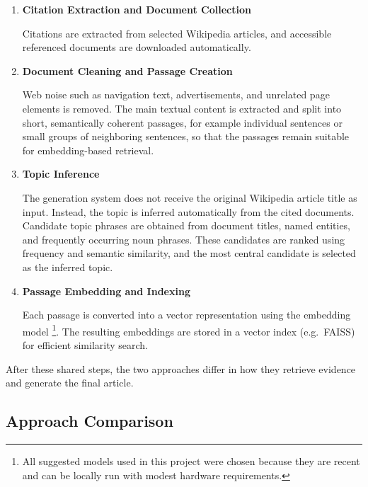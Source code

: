\documentclass[10pt,a4paper]{article}
\begin{document}
\begin{enumerate}
    \item \textbf{Citation Extraction and Document Collection}

    Citations are extracted from selected Wikipedia articles, and accessible referenced documents are downloaded automatically.

    \item \textbf{Document Cleaning and Passage Creation}

    Web noise such as navigation text, advertisements, and unrelated page elements is removed. The main textual content is extracted and split into short, semantically coherent passages, for example individual sentences or small groups of neighboring sentences, so that the passages remain suitable for embedding-based retrieval.

    \item \textbf{Topic Inference}

    The generation system does not receive the original Wikipedia article title as input. Instead, the topic is inferred automatically from the cited documents. Candidate topic phrases are obtained from document titles, named entities, and frequently occurring noun phrases. These candidates are ranked using frequency and semantic similarity, and the most central candidate is selected as the inferred topic.

    \item \textbf{Passage Embedding and Indexing}

    Each passage is converted into a vector representation using the embedding model
    \href{https://huggingface.co/sentence-transformers/all-MiniLM-L6-v2}{\texttt{}}\footnote{\label{ftnt:models}All suggested models used in this project were chosen because they are recent and can be locally run with modest hardware requirements.}. The resulting embeddings are stored in a vector index (e.g.\ FAISS) for efficient similarity search.
\end{enumerate}

After these shared steps, the two approaches differ in how they retrieve evidence and generate the final article.

\subsection*{Approach Comparison}
\end{document}
